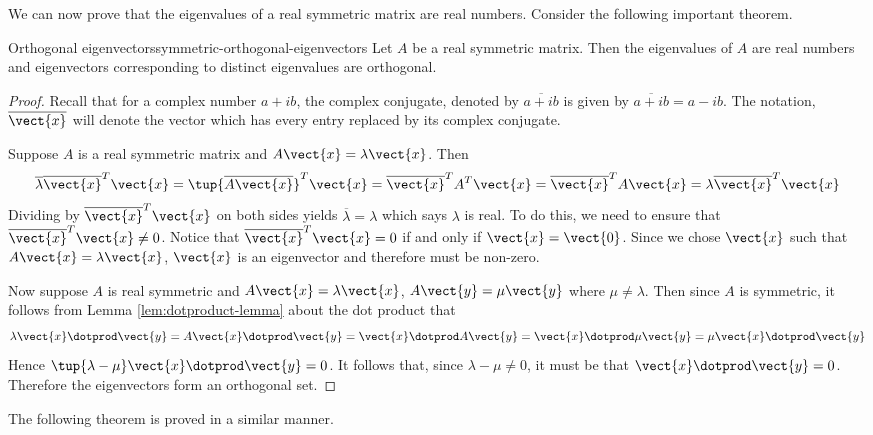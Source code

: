 We can now prove that the eigenvalues of a real symmetric matrix are real numbers.  Consider the following important theorem. 

\begin{theorem}{Orthogonal eigenvectors}{symmetric-orthogonal-eigenvectors}
Let $A$ be a real symmetric matrix. Then the eigenvalues of $A$ are real numbers and eigenvectors corresponding to distinct eigenvalues are orthogonal. 
\end{theorem}

\begin{proof}
Recall that for a complex number $a+ib$, the complex conjugate, denoted by $
\overline{a+ib}$ is given by $\overline{a+ib}=a-ib$. The
notation, $\overline{\vect{x}}$ will denote the vector which has every
entry replaced by its complex conjugate.

Suppose $A$ is a real symmetric matrix and $A\vect{x}=\lambda \vect{x}$.
Then 
\begin{equation*}
\overline{\lambda }\overline{\vect{x}}^{T}\vect{x}=\tup{\overline{A
\vect{x}}} ^{T}\vect{x}=\overline{\vect{x}}^{T}A^{T}\vect{x}=
\overline{\vect{x}}^{T}A\vect{x}=\lambda \overline{\vect{x}}^{T}
\vect{x}
\end{equation*}
Dividing by $\overline{\vect{x}}^{T}\vect{x}$ on both sides yields $
\overline{\lambda }=\lambda $ which says $\lambda $ is real. To do this, we need to ensure that $\overline{\vect{x}}^{T}\vect{x} \neq 0$. Notice that $\overline{\vect{x}}^{T}\vect{x} = 0$ if and only if $\vect{x} = \vect{0}$. Since we chose $\vect{x}$ such that $A\vect{x} = \lambda \vect{x}$, $\vect{x}$ is an eigenvector and therefore must be non-zero.  

Now suppose $A$ is real symmetric and $A\vect{x}=\lambda \vect{x}$, $A
\vect{y}=\mu \vect{y}$ where $\mu \neq \lambda$. Then since $A$
is symmetric, it follows from Lemma \ref{lem:dotproduct-lemma} about the dot product that 
\begin{equation*}
\lambda \vect{x}\dotprod \vect{y}=A\vect{x}\dotprod \vect{y}=\vect{x}\dotprod A\vect{y}=\vect{x}\dotprod \mu \vect{y}=\mu \vect{x}\dotprod \vect{y}
\end{equation*}
Hence $\tup{\lambda -\mu } \vect{x}\dotprod \vect{y}=0$. It follows that,
since $\lambda -\mu \neq 0$, it must be that $\vect{x}\dotprod \vect{y}=0$. Therefore the eigenvectors form an orthogonal set. 
\end{proof}

The following theorem is proved in a similar manner.

